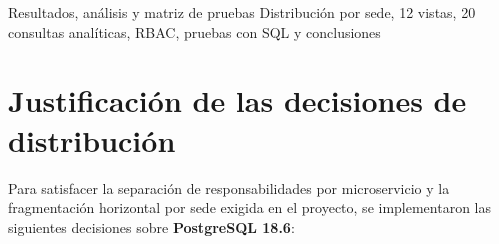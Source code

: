 \documentclass[11pt,oneside]{article}
\begin{document}
  {Resultados, an\'alisis y matriz de pruebas}
  {Distribuci\'on por sede, 12 vistas, 20 consultas anal\'iticas, RBAC, pruebas con SQL y conclusiones}

\tableofcontents
\vspace{0.4em}

\section{Justificaci\'on de las decisiones de distribuci\'on}

Para satisfacer la separaci\'on de responsabilidades por microservicio y la
fragmentaci\'on horizontal por sede exigida en el proyecto, se implementaron
las siguientes decisiones sobre \textbf{PostgreSQL 18.6}:
\end{document}
